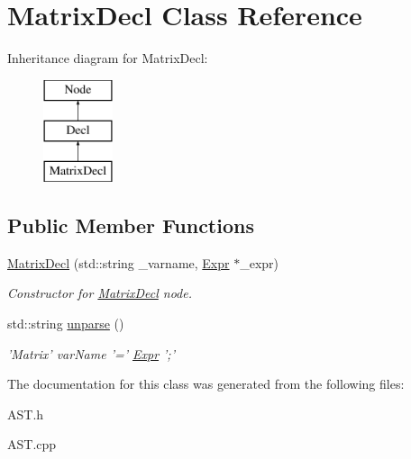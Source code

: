 \hypertarget{classMatrixDecl}{\section{Matrix\-Decl Class Reference}
\label{classMatrixDecl}
}
Inheritance diagram for Matrix\-Decl\-:\begin{figure}[H]
\begin{center}
\leavevmode
\includegraphics[height=3.000000cm]{classMatrixDecl}
\end{center}
\end{figure}
\subsection*{Public Member Functions}
\begin{DoxyCompactItemize}
\item 
\hypertarget{classMatrixDecl_a805f800309bafcfa1f5b80c3621f142e}{\hyperlink{classMatrixDecl_a805f800309bafcfa1f5b80c3621f142e}{Matrix\-Decl} (std\-::string \-\_\-varname, \hyperlink{classExpr}{Expr} $\ast$\-\_\-expr)}\label{classMatrixDecl_a805f800309bafcfa1f5b80c3621f142e}

\begin{DoxyCompactList}\small\item\em Constructor for \hyperlink{classMatrixDecl}{Matrix\-Decl} node. \end{DoxyCompactList}\item 
\hypertarget{classMatrixDecl_a86609ed608879ec9a72a2a96ea924c89}{std\-::string \hyperlink{classMatrixDecl_a86609ed608879ec9a72a2a96ea924c89}{unparse} ()}\label{classMatrixDecl_a86609ed608879ec9a72a2a96ea924c89}

\begin{DoxyCompactList}\small\item\em 'Matrix' var\-Name '=' \hyperlink{classExpr}{Expr} ';' \end{DoxyCompactList}\end{DoxyCompactItemize}


The documentation for this class was generated from the following files\-:\begin{DoxyCompactItemize}
\item 
A\-S\-T.\-h\item 
A\-S\-T.\-cpp\end{DoxyCompactItemize}
